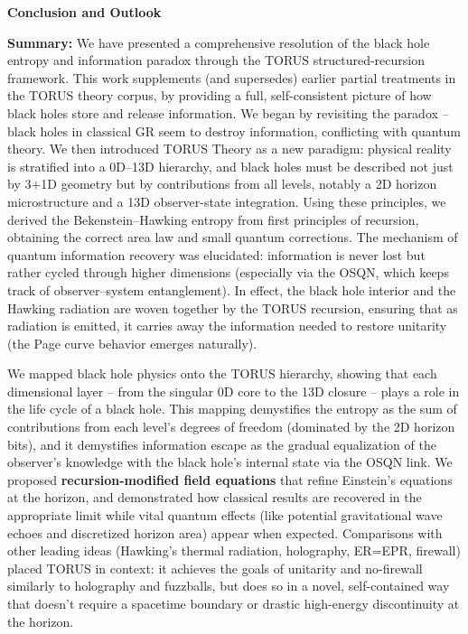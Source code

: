 \documentclass[]{article}
\begin{document}
\textbf{Conclusion and Outlook}

\textbf{Summary:} We have presented a comprehensive resolution of the
black hole entropy and information paradox through the TORUS
structured-recursion framework. This work supplements (and supersedes)
earlier partial treatments in the TORUS theory corpus, by providing a
full, self-consistent picture of how black holes store and release
information. We began by revisiting the paradox -- black holes in
classical GR seem to destroy information, conflicting with quantum
theory. We then introduced TORUS Theory as a new paradigm: physical
reality is stratified into a 0D--13D hierarchy, and black holes must be
described not just by 3+1D geometry but by contributions from all
levels, notably a 2D horizon microstructure and a 13D observer-state
integration. Using these principles, we derived the Bekenstein--Hawking
entropy from first principles of recursion, obtaining the correct area
law and small quantum corrections. The mechanism of quantum information
recovery was elucidated: information is never lost but rather cycled
through higher dimensions (especially via the OSQN, which keeps track of
observer--system entanglement). In effect, the black hole interior and
the Hawking radiation are woven together by the TORUS recursion,
ensuring that as radiation is emitted, it carries away the information
needed to restore unitarity (the Page curve behavior emerges naturally).

We mapped black hole physics onto the TORUS hierarchy, showing that each
dimensional layer -- from the singular 0D core to the 13D closure --
plays a role in the life cycle of a black hole. This mapping demystifies
the entropy as the sum of contributions from each level's degrees of
freedom (dominated by the 2D horizon bits), and it demystifies
information escape as the gradual equalization of the observer's
knowledge with the black hole's internal state via the OSQN link. We
proposed \textbf{recursion-modified field equations} that refine
Einstein's equations at the horizon, and demonstrated how classical
results are recovered in the appropriate limit while vital quantum
effects (like potential gravitational wave echoes and discretized
horizon area) appear when expected. Comparisons with other leading ideas
(Hawking's thermal radiation, holography, ER=EPR, firewall) placed TORUS
in context: it achieves the goals of unitarity and no-firewall similarly
to holography and fuzzballs, but does so in a novel, self-contained way
that doesn't require a spacetime boundary or drastic high-energy
discontinuity at the horizon.
\end{document}
